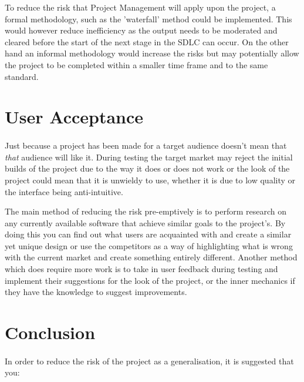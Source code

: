 To reduce the risk that Project Management will apply upon the project, a formal
methodology, such as the 'waterfall' method could be implemented.  This would
however reduce inefficiency as the output needs to be moderated and cleared
before the start of the next stage in the SDLC can occur.  On the other hand an
informal methodology would increase the risks but may potentially allow the
project to be completed within a smaller time frame and to the same standard.

\section{User Acceptance}
\paragraph{}

Just because a project has been made for a target audience doesn't mean that
\textit{that} audience will like it.  During testing the target market may
reject the initial builds of the project due to the way it does or does not work
or the look of the project could mean that it is unwieldy to use, whether it is
due to low quality or the interface being anti-intuitive.

The main method of reducing the risk pre-emptively is to perform research on any
currently available software that achieve similar goals to the project's.  By
doing this you can find out what users are acquainted with and create a similar
yet unique design or use the competitors as a way of highlighting what is wrong
with the current market and create something entirely different.  Another method
which does require more work is to take in user feedback during testing and
implement their suggestions for the look of the project, or the inner mechanics
if they have the knowledge to suggest improvements.

\section{Conclusion}
\paragraph{}

In order to reduce the risk of the project as a generalisation, it is suggested
that you:

